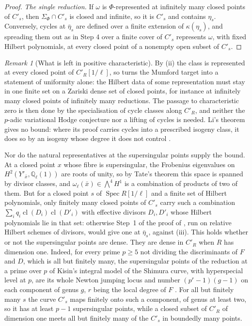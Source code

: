 \documentclass[11pt,reqno]{amsart}
\theoremstyle{plain}
\theoremstyle{definition}
\theoremstyle{remark}
\newtheorem{remark}[theorem]{Remark}
\newcommand{\QQ}{\mathbb{Q}}
\DeclareMathOperator{\Spec}{Spec}
\begin{document}
\begin{proof}
\emph{The single reduction.} If $\omega$ is $\Phi$-represented at infinitely
many closed points of $C'_{s}$, then $\Sigma_{\Phi}\cap C'_{s}$ is closed and
infinite, so it is $C'_{s}$ and contains $\eta_{s}$. Conversely, cycles at
$\bar\eta_{s}$ are defined over a finite extension of $\kappa(\eta_{s})$, and
spreading them out as in Step 4 over a finite cover of $C'_{s}$ represents
$\omega$, with fixed Hilbert polynomials, at every closed point of a nonempty
open subset of $C'_{s}$.
\end{proof}

\begin{remark}[What is left in positive characteristic]\label{rem:modpremains}
By (ii) the class is represented at every closed point of
$C'_{R}[1/\ell]$, so  turns the Mumford target into a
statement of uniformity alone: the Hilbert data of some representation must
stay in one finite set on a Zariski dense set of closed points, for instance
at infinitely many closed points of infinitely many reductions. The passage
to characteristic zero is then done by the specialisation of cycle classes
along $C'_{R}$, and neither the $p$-adic variational Hodge conjecture nor a
lifting of cycles is needed. Li's theorem gives no bound: where its proof
carries cycles into a prescribed isogeny class, it does so by an isogeny whose
degree it does not control \cite[proof of Theorem~1.2, Step~3]{Li26}.

Nor do the natural representatives at the supersingular points supply the
bound. At a closed point $x$ whose fibre is supersingular, the Frobenius
eigenvalues on $H^{2}(Y'_{\bar{x}},\QQ_{\ell}(1))$ are roots of unity, so by
Tate's theorem \cite{Tat66} this space is spanned by divisor classes, and
$\omega_{\ell}(\bar{x})\in{\textstyle\bigwedge^{4}}H^{1}$ is a combination of
products of two of them. But for a closed point $s$ of $\Spec R[1/\ell]$ and
a finite set of Hilbert polynomials, only finitely many closed points of
$C'_{s}$ carry such a combination $\sum_{i}q_{i}\operatorname{cl}(D_{i})
\operatorname{cl}(D'_{i})$ with effective divisors $D_{i},D'_{i}$ whose
Hilbert polynomials lie in that set: otherwise Step~1 of the proof of
, run on relative Hilbert schemes of divisors, would
give one at $\bar\eta_{s}$, against (iii). This holds whether
or not the supersingular points are dense. They are dense in $C'_{R}$ when $R$
has dimension one. Indeed, for every prime $p\ge5$ not dividing the
discriminants of $F$ and $D$, which is all but finitely many, the
supersingular points of the reduction at a prime over $p$ of Kisin's integral
model of the Shimura curve, with hyperspecial level at $p$, are its whole
Newton jumping locus and number $(p^{r}-1)(g-1)$ on each component of genus
$g$, $r$ being the local degree of $F$ \cite[Theorem~1.2 and
Corollary~5.17]{SZ11}. For all but finitely many $s$ the curve $C'_{s}$ maps
finitely onto such a component, of genus at least two, so it has at least
$p-1$ supersingular points, while a closed subset of $C'_{R}$ of dimension one
meets all but finitely many of the $C'_{s}$ in boundedly many points.


\end{remark}
\end{document}
